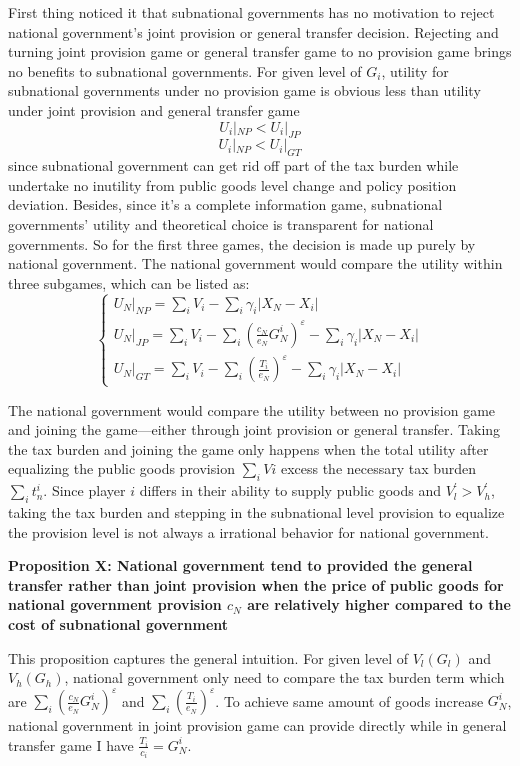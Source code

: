 \begin{itemize}
First thing noticed it that subnational governments has no motivation to reject national government's joint provision or general transfer decision. Rejecting and turning joint provision game or general transfer game to no provision game brings no benefits to subnational governments. For given level of $G_i$, utility for subnational governments under no provision game is obvious less than utility under joint provision and general transfer game $$U_i|_{NP} < U_i|_ {JP}$$  $$U_i|_{NP} < U_i|_{GT}$$ since subnational government can get rid off part of the tax burden while undertake no inutility from public goods level change and policy position deviation. Besides, since it's a complete information game, subnational governments' utility and theoretical choice is transparent for national governments. So for the first three games, the decision is made up purely by national government. The national government would compare the utility within three subgames, which can be listed as:
$$
    \left\{\begin{array}{l}
        U_N|_{NP}=\sum_i V_i-\sum_i \gamma_i\left|X_N-X_i\right|                                                       \\
        U_N|_{JP}=\sum_i V_i-\sum_i\left(\frac{c_N}{e_N} G_N^i\right)^{\varepsilon}-\sum_i\gamma_i\left|X_N-X_i\right| \\
        U_N|_{GT}=\sum_i V_i-\sum_i\left(\frac{T_i}{e_N}\right)^{\varepsilon}-\sum_i \gamma_i \left|X_N-X_i\right|
    \end{array}\right.
$$

The national government would compare the utility  between no provision game and joining the game---either through joint provision or general transfer. Taking the tax burden and joining the game only happens when the total utility after equalizing the public goods provision $\sum_i Vi$ excess the necessary tax burden $\sum_i t_n^i$. Since player $i$ differs in their ability to supply public goods and $V^\prime_l > V^\prime_h$, taking the tax burden and stepping in the subnational level provision to equalize the provision level is not always a irrational behavior for national government.

\textbf{Proposition X: National government tend to provided the general transfer rather than joint provision when the price of public goods for national government provision $c_N$ are relatively higher compared to the cost of subnational government}

This proposition captures the general intuition. For given level of $V_l(G_l)$ and $V_h(G_h)$, national government only need to compare the tax burden term which are $\sum_i\left(\frac{c_N}{e_N} G_N^i\right)^{\varepsilon}$ and $\sum_i\left(\frac{T_i}{e_N}\right)^{\varepsilon}$. To achieve same amount of goods increase $G_N^i$, national government in joint provision game can provide directly while in general transfer game I have $\frac{T_i}{c_i}=G_N^i$.


\end{itemize}

